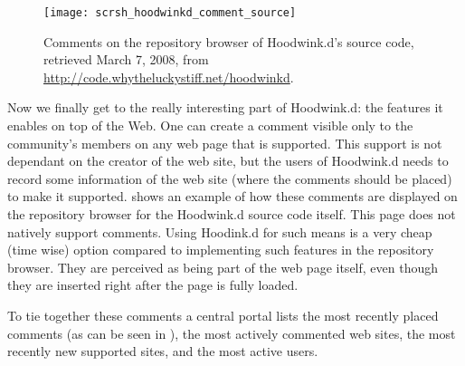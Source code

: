 \begin{figure}
  \begin{whole}
    \centering
    \texttt{[image: scrsh\_hoodwinkd\_comment\_source]}
    \caption[Hoodwink.d Comments]{
      Comments on the repository browser of Hoodwink.d's source code,
      retrieved March 7, 2008, from
      \url{http://code.whytheluckystiff.net/hoodwinkd}.
    }
    \label{figure:scrsh.hoodwinkd.comment.source}
  \end{whole}
\end{figure}

Now we finally get to the really interesting part of Hoodwink.d: the features
it enables on top of the Web. One can create a comment visible only to the
community's members on any web page that is supported. This support is not
dependant on the creator of the web site, but the users of Hoodwink.d needs to
record some information of the web site (where the comments should be placed)
to make it supported.  shows an
example of how these comments are displayed on the repository browser for
the Hoodwink.d source code itself. This page does not natively support
comments. Using Hoodink.d for such means is a very cheap (time wise) option
compared to implementing such features in the repository browser.
They are perceived as being part of the web page itself, even though they
are inserted right after the page is fully loaded.

To tie together these comments a central portal lists
the most recently placed comments (as can be seen in
), the most actively commented web
sites, the most recently new supported sites, and the most active users.


